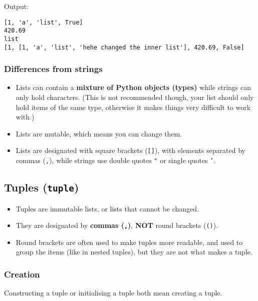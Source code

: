 \documentclass[11pt]{article}
\begin{document}
 \noindent Output:

\label{orgfd29f83}
\begin{verbatim}
[1, 'a', 'list', True]
420.69
list
[1, [1, 'a', 'list', 'hehe changed the inner list'], 420.69, False]
\end{verbatim}
\subsubsection{Differences from strings}
\label{sec:orga7521aa}
\begin{itemize}
\item Lists can contain a \textbf{mixture of Python objects (types)} while strings can only hold characters. (This is not recommended though, your list should only hold items of the same type, otherwise it makes things very difficult to work with.)
\item Lists are mutable, which means you can change them.
\item Lists are designated with square brackets (\texttt{[]}), with elements separated by commas (\texttt{,}), while strings use double quotes \texttt{"} or single quotes \texttt{'}.
\end{itemize}
\subsection{Tuples (\texttt{tuple})}
\label{sec:org06b33c9}
\begin{itemize}
\item Tuples are immutable lists, or lists that cannot be changed.
\item They are designated by \textbf{commas (\texttt{,})}, \textbf{NOT} round brackets (\texttt{()}).
\item Round brackets are often used to make tuples more readable, and used to group the items (like in nested tuples), but they are not what makes a tuple.
\end{itemize}
\subsubsection{Creation}
\label{sec:org5be2304}
Constructing a tuple or initialising a tuple both mean creating a tuple.
\end{document}
